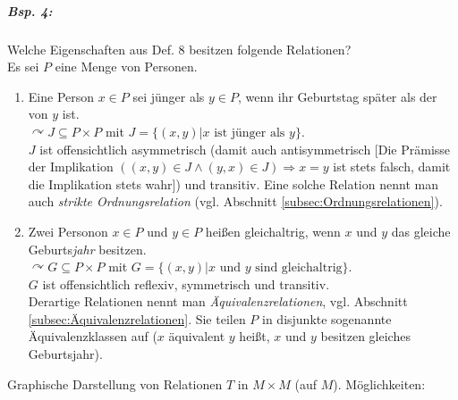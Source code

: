 \subparagraph{Bsp. 4:} \parskp
Welche Eigenschaften aus Def. 8 besitzen folgende Relationen?\\
Es sei $P$ eine Menge von Personen.
\begin{enumerate} [label=\alph*)]
\item Eine Person $x\in P$ sei jünger als $y\in P$, wenn ihr Geburtstag später als der von $y$ ist.\\
$\curvearrowright J \subseteq P \times P$ mit $J=\{ (x,y) | x \text{ ist jünger als } y\}$.\\
$J$ ist offensichtlich asymmetrisch (damit auch antisymmetrisch [Die Prämisse der Implikation $((x,y) \in J \wedge (y,x) \in J) \Rightarrow x=y$ ist stets falsch, damit die Implikation stets wahr]) und transitiv. Eine solche Relation nennt man auch \emph{strikte Ordnungsrelation} (vgl. Abschnitt \ref{subsec:Ordnungsrelationen}).
\item Zwei Personon $x\in P$ und $y\in P$ heißen gleichaltrig, wenn $x$ und $y$ das gleiche Geburts\emph{jahr} besitzen.\\
$\curvearrowright G \subseteq P\times P$ mit $G= \{ (x,y) | x \text{ und } y \text{ sind gleichaltrig}\}$.\\
$G$ ist offensichtlich reflexiv, symmetrisch und transitiv.\\
Derartige Relationen nennt man \emph{Äquivalenzrelationen}, vgl. Abschnitt \ref{subsec:Äquivalenzrelationen}. Sie teilen $P$ in disjunkte sogenannte Äquivalenzklassen auf ($x$ äquivalent $y$ heißt, $x$ und $y$ besitzen gleiches Geburtsjahr).
\end{enumerate}
Graphische Darstellung von Relationen $T$ in $M\times M$ (auf $M$). Möglichkeiten:
